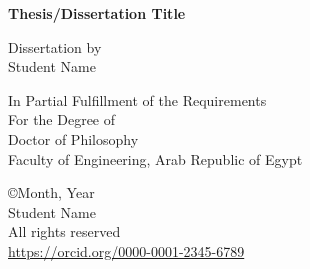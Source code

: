 
\thispagestyle{empty}
\addvspace{5mm}  %

\begin{center}
	\begin{doublespace}
		{\textbf{{\large Thesis/Dissertation Title}}}%
	\end{doublespace}

	\vspace{10mm}
	{Dissertation by}\\
	{Student Name} %

	\vspace{30mm}

	{ In Partial Fulfillment of the Requirements}\\[12pt]
	{ For the Degree of}\\[12pt]
	{Doctor of Philosophy} \vfill
	{\Tanta}\\
	{Faculty of Engineering, Arab Republic	of Egypt} \vfill
	\vfill


	\begin{onehalfspace}
		{\copyright Month, Year}\\
		Student Name\\               %
		All rights reserved\\

		\orcid{} \small \href{https://orcid.org/0000-0001-2345-6789}{https://orcid.org/0000-0001-2345-6789}\\
	\end{onehalfspace}

\end{center}
